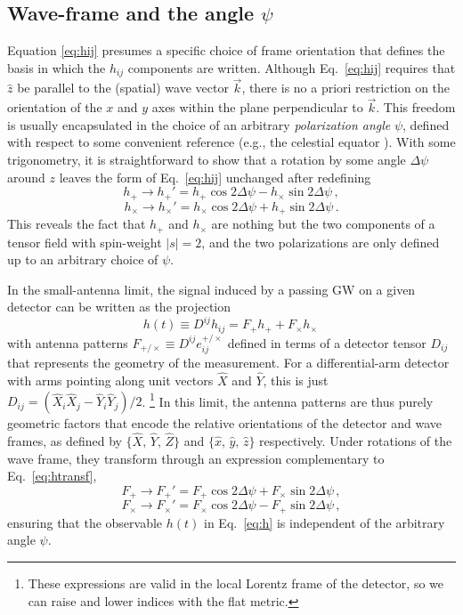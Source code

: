 \documentclass[aps,prd,twocolumn,superscriptaddress,preprintnumbers,floatfix,nofootinbib]{revtex4-2}
\newcommand{\beq}{\begin{equation}}
\newcommand{\eeq}{\end{equation}}
\newcommand*{\eq}[1]{Eq.~\eqref{eq:#1}}
\begin{document}
\subsection{Wave-frame and the angle $\psi$}
\label{sec:pol}

Equation \eqref{eq:hij} presumes a specific choice of frame orientation that defines the basis in which the $h_{ij}$ components are written.
Although \eq{hij} requires that $\hat{z}$ be parallel to the (spatial) wave vector $\vec{k}$, there is no a priori restriction on the orientation of the $x$ and $y$ axes within the plane perpendicular to $\vec{k}$.
This freedom is usually encapsulated in the choice of an arbitrary \emph{polarization angle} $\psi$, defined with respect to some convenient reference (e.g., the celestial equator \cite{LALSuite:wave}).
With some trigonometry, it is straightforward to show that a rotation by some angle $\Delta \psi$ around $z$ leaves the form of \eq{hij} unchanged after redefining
\beq \label{eq:htransf}
h_+ \rightarrow h_+' = h_+ \cos 2\Delta \psi - h_\times \sin 2\Delta\psi \, ,
\eeq
\beq
h_\times \rightarrow h_\times' = h_\times \cos 2\Delta \psi + h_+ \sin 2\Delta\psi \, .
\eeq
This reveals the fact that $h_+$ and $h_\times$ are nothing but the two components of a tensor field with spin-weight $|s|=2$, and the two polarizations are only defined up to an arbitrary choice of $\psi$.


In the small-antenna limit, the signal induced by a passing GW on a given detector can be written as the projection
\beq \label{eq:h}
h(t) \equiv D^{ij} h_{ij} = F_+ h_+ + F_\times h_\times\, 
\eeq
with antenna patterns $F_{+/\times} \equiv D^{ij} e^{+/\times}_{ij}$ defined in terms of a detector tensor $D_{ij}$ that represents the geometry of the measurement.
For a differential-arm detector with arms pointing along unit vectors $\hat{X}$ and $\hat{Y}$, this is just $D_{ij} = (\hat{X}_i \hat{X}_j - \hat{Y}_i \hat{Y}_j)/2$.%
\footnote{These expressions are valid in the local Lorentz frame of the detector, so we can raise and lower indices with the flat metric.}
In this limit, the antenna patterns are thus purely geometric factors that encode the relative orientations of the detector and wave frames, as defined by $\{\hat{X},\, \hat{Y},\, \hat{Z}\}$ and $\{\hat{x},\, \hat{y},\, \hat{z}\}$ respectively.
Under rotations of the wave frame, they transform through an expression complementary to \eq{htransf},
\beq \label{eq:Ftransf}
F_+ \rightarrow F_+' = F_+ \cos 2\Delta \psi + F_\times \sin 2\Delta\psi \, ,
\eeq
\beq
F_\times \rightarrow F_\times' = F_\times \cos 2\Delta \psi - F_+ \sin 2\Delta\psi \, ,
\eeq
ensuring that the observable $h(t)$ in \eq{h} is independent of the arbitrary angle $\psi$.
\end{document}
